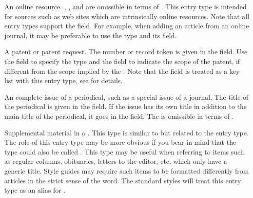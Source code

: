 \documentclass{ltxdockit}[2011/03/25]
\begin{document}
\begin{typelist}


An online resource. , , and  are omissible in terms of . This entry type is intended for sources such as web sites which are intrinsically online resources. Note that all entry types support the  field. For example, when adding an article from an online journal, it may be preferable to use the  type and its  field.



A patent or patent request. The number or record token is given in the  field. Use the  field to specify the type and the  field to indicate the scope of the patent, if different from the scope implied by the . Note that the  field is treated as a key list with this entry type, see  for details.



An complete issue of a periodical, such as a special issue of a journal. The title of the periodical is given in the  field. If the issue has its own title in addition to the main title of the periodical, it goes in the  field. The  is omissible in terms of .



Supplemental material in a . This type is similar to  but related to the  entry type. The role of this entry type may be more obvious if you bear in mind that the  type could also be called . This type may be useful when referring to items such as regular columns, obituaries, letters to the editor, etc. which only have a generic title. Style guides may require such items to be formatted differently from articles in the strict sense of the word. The standard styles will treat this entry type as an alias for .


\end{typelist}
\end{document}
